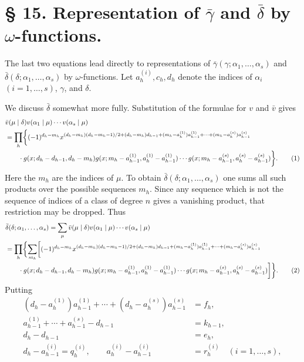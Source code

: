 \documentclass[11pt,a4paper]{article}
\begin{document}
\section*{§ 15. Representation of $\bar\gamma$ and $\bar\delta$ by $\omega$-functions.}

The last two equations lead directly to representations of $\bar\gamma(\gamma;\alpha_1,
\ldots,\alpha_s)$ and $\bar\delta(\delta;\alpha_1,
\ldots,\alpha_s)$ by $\omega$-functions. Let $a_h^{(i)},c_h,d_h$ denote the indices of $\alpha_i$ $(i=1,
\ldots,s)$, $\gamma$, and $\delta$.

We discuss $\bar\delta$ somewhat more fully. Substitution of the formulae for $v$ and $\bar v$ gives
\begin{align}
&\bar v(\mu\mid\delta)v(\alpha_1\mid\mu)\cdots v(\alpha_s\mid\mu)\notag\\
&=\prod_h\biggl\{(-1)^{d_h-m_h}
 x^{(d_h-m_h)(d_h-m_h-1)/2+(d_h-m_h)d_{h-1}+(m_h-a_h^{(1)})a_{h-1}^{(1)}+\cdots+(m_h-a_h^{(s)})a_{h-1}^{(s)}}
\notag\\
&\qquad\cdot g(x;d_h-d_{h-1},d_h-m_h)g(x;m_h-a_{h-1}^{(1)},a_h^{(1)}-a_{h-1}^{(1)})
\cdots g(x;m_h-a_{h-1}^{(s)},a_h^{(s)}-a_{h-1}^{(s)})\biggr\}.
\tag{1}
\end{align}
Here the $m_h$ are the indices of $\mu$. To obtain $\bar\delta(\delta;\alpha_1,
\ldots,\alpha_s)$ one sums all such products over the possible sequences $m_h$. Since any sequence which is not the sequence of indices of a class of degree $n$ gives a vanishing product, that restriction may be dropped. Thus
\begin{align}
&\bar\delta(\delta;\alpha_1,\ldots,\alpha_s)
 =\sum_\mu \bar v(\mu\mid\delta)v(\alpha_1\mid\mu)\cdots v(\alpha_s\mid\mu)\notag\\
&=\prod_h\biggl\{\sum_{m_h}\biggl[(-1)^{d_h-m_h}
 x^{(d_h-m_h)(d_h-m_h-1)/2+(d_h-m_h)d_{h-1}+(m_h-a_h^{(1)})a_{h-1}^{(1)}+\cdots+(m_h-a_h^{(s)})a_{h-1}^{(s)}}\notag\\
&\qquad\cdot g(x;d_h-d_{h-1},d_h-m_h)g(x;m_h-a_{h-1}^{(1)},a_h^{(1)}-a_{h-1}^{(1)})\cdots g(x;m_h-a_{h-1}^{(s)},a_h^{(s)}-a_{h-1}^{(s)})\biggr]\biggr\}.
\tag{2}
\end{align}
Putting
\begin{align}
(d_h-a_h^{(1)})a_{h-1}^{(1)}+\cdots+(d_h-a_h^{(s)})a_{h-1}^{(s)}&=f_h,
\tag{3}\\
a_{h-1}^{(1)}+\cdots+a_{h-1}^{(s)}-d_{h-1}&=k_{h-1},
\tag{4}\\
d_h-d_{h-1}&=e_h,
\tag{5}\\
d_h-a_{h-1}^{(i)}=q_h^{(i)},\qquad a_h^{(i)}-a_{h-1}^{(i)}&=r_h^{(i)}\quad(i=1,\ldots,s),
\tag{6}
\end{align}
\end{document}
